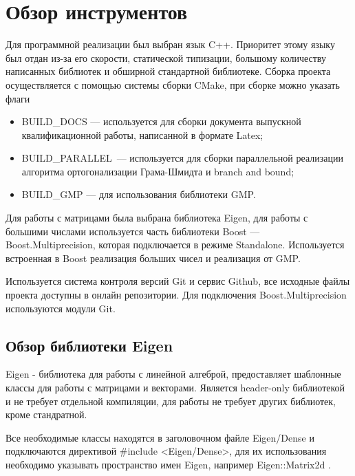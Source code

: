 \newpage

\section{Обзор инструментов}

Для программной реализации был выбран язык C++. Приоритет этому языку был отдан из-за его скорости, статической типизации, большому количеству написанных библиотек и обширной стандартной библиотеке. Сборка проекта осуществляется с помощью системы сборки CMake, при сборке можно указать флаги 
\begin{itemize}

\item BUILD\_DOCS --- используется для сборки документа выпускной квалификационной работы, написанной в формате Latex;

\item BUILD\_PARALLEL\ ---  используется для сборки параллельной реализации алгоритма ортогонализации Грама-Шмидта и branch and bound;

\item BUILD\_GMP --- для использования библиотеки GMP.

\end{itemize} 

Для работы с матрицами была выбрана библиотека Eigen, для работы с большими числами используется часть библиотеки Boost --- Boost.Multiprecision, которая подключается в режиме Standalone. Используется встроенная в Boost реализация больших чисел и реализация от GMP.

Используется система контроля версий Git и сервис Github, все исходные файлы проекта доступны в онлайн репозитории. Для подключения Boost.Multiprecision используются модули Git.

\subsection{Обзор библиотеки Eigen}

Eigen - библиотека для работы с линейной алгеброй, предоставляет шаблонные классы для работы с матрицами и векторами. Является header-only библиотекой и не требует отдельной компиляции, для работы не требует других библиотек, кроме стандратной.

Все необходимые классы находятся в заголовочном файле Eigen/Dense и подключаются директивой \#include <Eigen/Dense>, для их использования необходимо указывать пространство имен Eigen, например Eigen::Matrix2d \cite{EigenDoc}.

